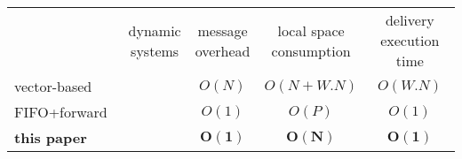 \newcommand{\cmark}{\ding{51}}%
\newcommand{\xmark}{\ding{55}}%

\setlength{\tabcolsep}{3pt} %

\begin{tabularx}{0.98\columnwidth}{@{}Xcccc@{}}
  & \makecell{dynamic\\systems} & \makecell{message\\overhead} & \makecell{local space\\consumption} &  \makecell{delivery\\execution time} \\ \cmidrule{2-5}
  vector-based~\cite{schwarz1994detecting} & \cmark & $O(N)$ & $O(N+W.N)$ & $O(W.N)$ \\
  FIFO+forward~\cite{friedman2004causal} & \xmark & $O(1)$ & $O(P)$ & $O(1)$ \\ \hline\hline
  \textbf{this paper} & \textbf{\cmark} & $\mathbf{O(1)}$ & $\mathbf{O(N)}$ & $\mathbf{O(1)}$ \\ 
\end{tabularx}

